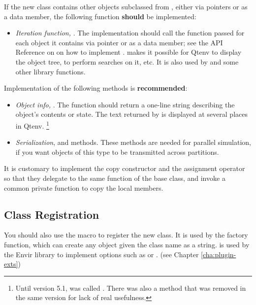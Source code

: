 If the new class contains other objects subclassed from ,
either via pointers or as a data member, the following function \textbf{should}
be implemented:

\begin{itemize}
  \item \textit{Iteration function,} .
        The implementation should call the function passed
        for each object it contains via pointer or as a data member;
        see the API Reference on  on how to implement
        .  makes it possible
        for Qtenv to display the object tree, to perform searches on it, etc.
        It is also used by  and some other library functions.
\end{itemize}

Implementation of the following methods is \textbf{recommended}:

\begin{itemize}
  \item \textit{Object info,} . The  function
        should return a one-line string describing the object's contents or state.
        The text returned by  is displayed at several places in Qtenv.
        \footnote{Until {\opp} version 5.1,  was called .
        There was also a  method that was removed in the
        same version for lack of real usefulness.}
  \item \textit{Serialization},  and  methods.
        These methods are needed for parallel simulation, if you want
        objects of this type to be transmitted across partitions.
\end{itemize}

It is customary to implement the copy constructor and the assignment operator
so that they delegate to the same function of the base class, and invoke a common
private  function to copy the local members.

\subsection{Class Registration}
\label{sec:sim-lib:class-registration}

You should also use the  macro to register the
new class. It is used by the  factory function, which can
create any object given the class name as a string. 
is used by the Envir library to implement  options
such as  or .
(see Chapter \ref{cha:plugin-exts})

